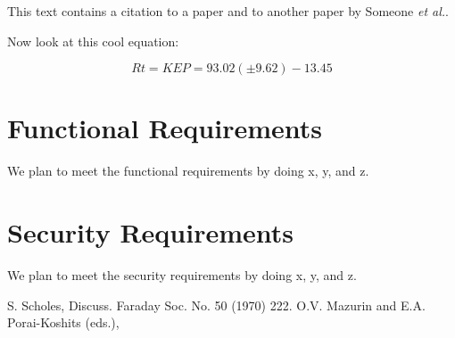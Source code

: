 \documentclass{prace}
\begin{document}
This text contains a citation to a paper\cite{scholes-DiscussFaradaySoc-70} and to another paper by Someone \emph{et al.}\cite{someone-SomeJournal-00}.

%

Now look at this cool equation:

\begin{equation}
	Rt = K EP = 93.02 (\pm 9.62) - 13.45
	\label{eq: example}
\end{equation}

\section{Functional Requirements}

We plan to meet the functional requirements by doing x, y, and z.

\section{Security Requirements}

We plan to meet the security requirements by doing x, y, and z.

%
\begin{thebibliography}{99}
	S. Scholes, Discuss. Faraday Soc. No. 50 (1970) 222.
	O.V. Mazurin and E.A. Porai-Koshits (eds.),
\end{thebibliography}
\end{document}
